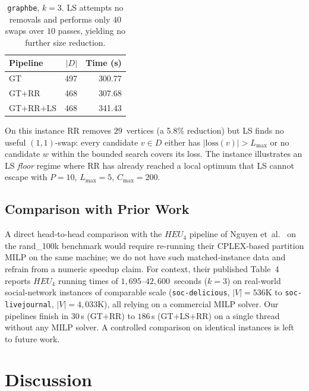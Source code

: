 \documentclass[11pt,a4paper]{article}
\newcommand{\loss}{\mathrm{loss}}
\begin{document}
\begin{table}[ht]
\centering
\caption{\texttt{graphbe}, $k=3$. LS attempts no removals and
  performs only $40$ swaps over $10$ passes, yielding no further size
  reduction.}
\label{tab:graphbe}
\begin{tabular}{lrr}
\toprule
\textbf{Pipeline} & $|D|$ & \textbf{Time (s)}\\
\midrule
GT             & 497 & 300.77 \\
GT$+$RR        & 468 & 307.68 \\
GT$+$RR$+$LS   & 468 & 341.43 \\
\bottomrule
\end{tabular}
\end{table}

On this instance RR removes $29$~vertices (a 5.8\% reduction) but LS
finds no useful $(1,1)$-swap: every candidate $v\in D$ either has
$|\loss(v)|>L_{\max}$ or no candidate $w$ within the bounded search
covers its loss. The instance illustrates an LS \emph{floor} regime
where RR has already reached a local optimum that LS cannot escape with
$P=10,\,L_{\max}=5,\,C_{\max}=200$.


\subsection{Comparison with Prior Work}
\label{sec:exp:vs-prior}

A direct head-to-head comparison with the $\mathit{HEU_4}$ pipeline of
Nguyen et~al.~\cite{nguyen2020} on the rand\_100k benchmark would
require re-running their CPLEX-based partition MILP on the same
machine; we do not have such matched-instance data and refrain from a
numeric speedup claim. For context, their published Table~4 reports
$\mathit{HEU_4}$ running times of $1{,}695$--$42{,}600$~seconds
($k=3$) on real-world social-network instances of comparable scale
(\texttt{soc-delicious}, $|V|=536$K to \texttt{soc-livejournal},
$|V|=4{,}033$K), all relying on a commercial MILP solver. Our pipelines
finish in $30$\,s (GT$+$RR) to $186$\,s (GT$+$LS$+$RR) on a single
thread without any MILP solver. A controlled comparison on identical
instances is left to future work.


\section{Discussion}
\label{sec:discussion}
\end{document}
